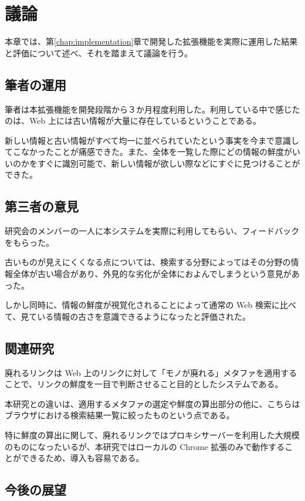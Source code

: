 \chapter{議論}
\label{chap:discussion}

本章では、第\ref{chap:implementation}章で開発した拡張機能を実際に運用した結果と評価について述べ、それを踏まえて議論を行う。

\section{筆者の運用}

筆者は本拡張機能を開発段階から３か月程度利用した。利用している中で感じたのは、Web 上には古い情報が大量に存在しているということである。

新しい情報と古い情報がすべて均一に並べられていたという事実を今まで意識してこなかったことが痛感できた。また、全体を一覧した際にどの情報の鮮度がいいのかをすぐに識別可能で、新しい情報が欲しい際などにすぐに見つけることができた。

\section{第三者の意見}

研究会のメンバーの一人に本システムを実際に利用してもらい、フィードバックをもらった。

古いものが見えにくくなる点については、検索する分野によってはその分野の情報全体が古い場合があり、外見的な劣化が全体におよんでしまうという意見があった。

しかし同時に、情報の鮮度が視覚化されることによって通常の Web 検索に比べて、見ている情報の古さを意識できるようになったと評価された。

\section{関連研究}

廃れるリンク\cite{dyinglink}は Web 上のリンクに対して「モノが廃れる」メタファを適用することで、リンクの鮮度を一目で判断させること目的としたシステムである。

本研究との違いは、適用するメタファの選定や鮮度の算出部分の他に、こちらはブラウザにおける検索結果一覧に絞ったものという点である。

特に鮮度の算出に関して、廃れるリンクではプロキシサーバーを利用した大規模のものになったいるが、本研究ではローカルの Chrome 拡張のみで動作することができるため、導入も容易である。

\section{今後の展望}

